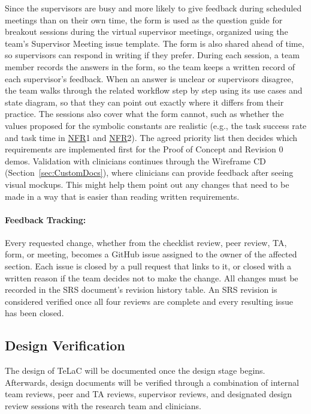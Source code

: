 \documentclass[12pt, titlepage]{article}
\newcommand{\srsnfr}[1]{\href{https://github.com/Nour-Fawaz/MacaBoca/blob/main/pdfs/SRS/SRS.pdf}{NFR}}
\renewcommand{\_}{\oldunderscore\allowbreak}
\begin{document}
Since the supervisors are busy and more likely to give feedback during scheduled meetings than on their own time, the form is used as the question guide for breakout sessions during the virtual supervisor meetings, organized using the team's Supervisor Meeting issue template. The form is also shared ahead of time, so supervisors can respond in writing if they prefer. During each session, a team member records the answers in the form, so the team keeps a written record of each supervisor's feedback. When an answer is unclear or supervisors disagree, the team walks through the related workflow step by step using its use cases and state diagram, so that they can point out exactly where it differs from their practice. The sessions also cover what the form cannot, such as whether the values proposed for the symbolic constants are realistic (e.g., the task success rate and task time in \srsnfr*{1} and \srsnfr*{2}). The agreed priority list then decides which requirements are implemented first for the Proof of Concept and Revision 0 demos. Validation with clinicians continues through the Wireframe CD (Section~\ref{sec:CustomDocs}), where clinicians can provide feedback after seeing visual mockups. This might help them point out any changes that need to be made in a way that is easier than reading written requirements.

\paragraph{Feedback Tracking:}
Every requested change, whether from the checklist review, peer review, TA, form, or meeting, becomes a GitHub issue assigned to the owner of the affected section. 
Each issue is closed by a pull request that links to it, or closed with a written reason if the team decides not to make the change. All changes must be recorded in the SRS document's revision history table.
An SRS revision is considered verified once all four reviews are complete and every resulting issue has been closed.

\subsection{Design Verification}

The design of TeLaC will be documented once the design stage begins. 
Afterwards, design documents will be verified through a combination
of internal team reviews, peer and TA reviews, supervisor
reviews, and designated design review sessions with the research
team and clinicians.
\end{document}
